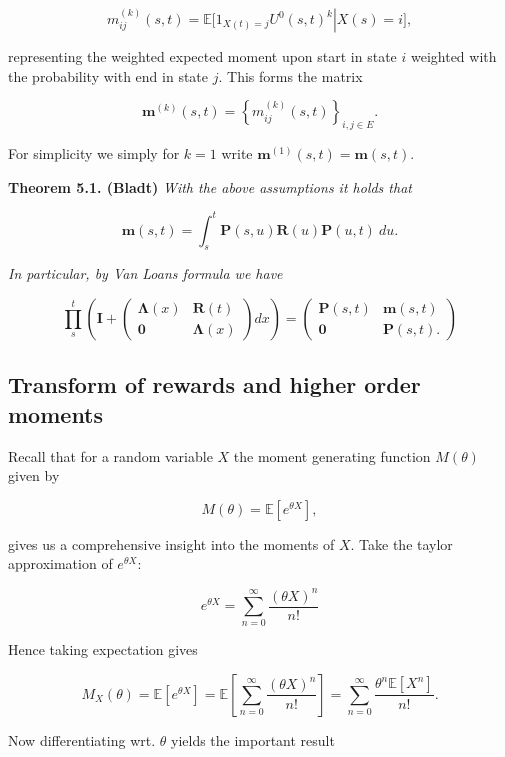 \documentclass[a4paper,12pt,openany]{book}
\begin{document}
\[
m_{ij}^{(k)}(s,t)=\mathbb E\left.\Big[1_{X(t)=j}U^0(s,t)^k\right\vert X(s)=i\Big],
\]

representing the weighted expected moment upon start in state \(i\) weighted with the probability with end in state \(j\). This forms the matrix

\[
\mathbf m^{(k)}(s,t)=\left\{m_{ij}^{(k)}(s,t)\right\}_{i,j\in E}.
\]

For simplicity we simply for \(k=1\) write \(\mathbf m^{(1)}(s,t) = \mathbf m(s,t)\).

\textbf{Theorem 5.1. (Bladt)} \emph{With the above assumptions it holds that}

\[
\mathbf m(s,t)=\int_s^t\mathbf P(s,u)\mathbf R(u)\mathbf P(u,t)\ du.
\]

\emph{In particular, by Van Loans formula we have}

\[
\prod_s^t\left(\mathbf I + \begin{pmatrix}\mathbf \Lambda(x) & \mathbf R(t)\\ \mathbf 0 & \mathbf \Lambda(x)\end{pmatrix} dx\right)=
\begin{pmatrix}
\mathbf P(s,t) & \mathbf m(s,t)\\
\mathbf 0 & \mathbf P(s,t).
\end{pmatrix}
\]

\hypertarget{transform-of-rewards-and-higher-order-moments}{%
\subsection{Transform of rewards and higher order moments}\label{transform-of-rewards-and-higher-order-moments}}

Recall that for a random variable \(X\) the moment generating function \(M(\theta)\) given by

\[
M(\theta)=\mathbb E[e^{\theta X}],
\]

gives us a comprehensive insight into the moments of \(X\). Take the taylor approximation of \(e^{\theta X}\):

\[
e^{\theta X}=\sum_{n=0}^\infty\frac{(\theta X)^n}{n!}
\]

Hence taking expectation gives

\[
M_X(\theta)=\mathbb E[e^{\theta X}]=\mathbb E\left[\sum_{n=0}^\infty\frac{(\theta X)^n}{n!}\right]=\sum_{n=0}^\infty\frac{\theta^n \mathbb E[X^n]}{n!}.
\]

Now differentiating wrt. \(\theta\) yields the important result
\end{document}
